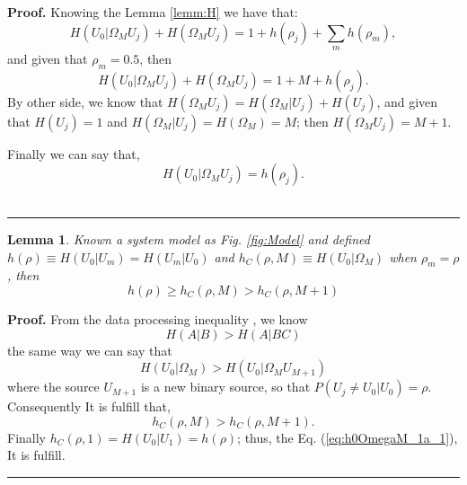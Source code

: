 \documentclass[a4paper,10pt]{article}
\newtheorem{mylemma}[mytheorem]{Lemma}
\newenvironment{myproof}[1][Proof]{\textbf{#1.} }{\ \rule{0.5em}{0.5em}}
\begin{document}
\begin{myproof}
 \label{proof:h0OmegaM_1}
 Knowing the Lemma \ref{lemm:H} we have that:
\begin{equation}\label{eq:h0OmegaM_1_b}
H(U_0|\Omega_M U_j) +H( \Omega_M U_j)=1 + h(\rho_j)+ \sum \limits_m h(\rho_m),
\end{equation}
and given that $\rho_m=0.5$, then
\begin{equation}\label{eq:h0OmegaM_1_b2}
H(U_0|\Omega_M U_j) +H( \Omega_M U_j)=1 + M + h(\rho_j).
\end{equation}
By other side, we know that $H( \Omega_M U_j)=H( \Omega_M|U_j)+H(U_j)$,
and given that $H(U_j)=1$ and $H( \Omega_M|U_j)=H( \Omega_M)=M$;
then $H( \Omega_M U_j)=M+1$.

Finally we can say that,
\begin{equation}\label{eq:h0OmegaM_1_c}
H(U_0|\Omega_M U_j) = h(\rho_j).
\end{equation}
\end{myproof}



\begin{mdframed}[style=MDFStyGrayScreen]
\begin{mylemma}
 \label{lemm:h0OmegaM_1a}
 Known a system model as Fig. \ref{fig:Model} and defined $h(\rho) \equiv H(U_0|U_m)=H(U_m|U_0)$ and 
 $h_{C}(\rho,M)\equiv H(U_0|\Omega_M)$ when $\rho_m=\rho$, then
  \begin{equation}\label{eq:h0OmegaM_1a_1}
h(\rho) \geq h_{C}(\rho,M) > h_{C}(\rho,M+1)
\end{equation}
\end{mylemma}
\end{mdframed}

\begin{myproof}\label{proof:h0OmegaM_1a}
From the data processing inequality \cite{dpi}, we know
 \begin{equation}
  H(A|B) >  H(A|BC)
 \end{equation}
 the same way we can say that
 \begin{equation}
  H(U_0|\Omega_M) >  H(U_0|\Omega_M U_{M+1})
 \end{equation}
 where the source $U_{M+1}$ is a new binary source, so that $P(U_j\neq U_0|U_0)=\rho$.
 Consequently It is fulfill that,
 \begin{equation}\label{eq:h0OmegaM_1a_2}
h_{C}(\rho,M) > h_{C}(\rho,M+1).
\end{equation}
Finally $h_{C}(\rho,1)=H(U_0|U_1)=h(\rho)$; thus, the Eq. (\ref{eq:h0OmegaM_1a_1}), It is fulfill.
\end{myproof}
\end{document}
